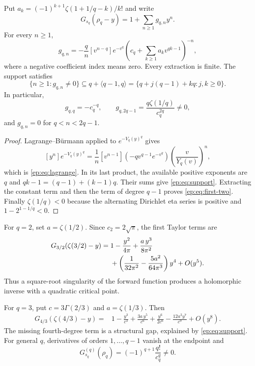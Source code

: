 \begin{proposition}
\label{ep:prop:coefficients}
Put $a_k=(-1)^{k+1}\zeta(1+1/q-k)/k!$ and write
\[
 G_{s_q}(\rho_q-y)=1+\sum_{n\ge1}g_{q,n}y^n.
\]
For every $n\ge1$,
\begin{equation}
 g_{q,n}=-\frac qn[v^{n-q}]
    e^{-v^q}\left(c_q+\sum_{k\ge1}a_kv^{qk-1}\right)^{-n},
 \label{ep:eq:lagrange}
\end{equation}
where a negative coefficient index means zero. Every extraction is
finite. The support satisfies
\begin{equation}
 \{n\ge1:g_{q,n}\ne0\}
 \subseteq q+\langle q-1,q\rangle
 =\{q+j(q-1)+kq:j,k\ge0\}.
 \label{ep:eq:support}
\end{equation}
In particular,
\begin{equation}
 g_{q,q}=-c_q^{-q},\qquad
 g_{q,2q-1}=\frac{q\zeta(1/q)}{c_q^{2q}}\ne0,
 \label{ep:eq:first-two}
\end{equation}
and $g_{q,n}=0$ for $q<n<2q-1$.
\end{proposition}

\begin{proof}
Lagrange--B\"urmann applied to $e^{-V_q(y)^q}$ gives
\[
 [y^n]e^{-V_q(y)^q}
 =\frac1n[v^{n-1}](-qv^{q-1}e^{-v^q})
                  \left(\frac v{Y_q(v)}\right)^n,
\]
which is \eqref{ep:eq:lagrange}. In its last product, the available
positive exponents are $q$ and $qk-1=(q-1)+(k-1)q$.
Their sums give \eqref{ep:eq:support}. Extracting the constant
term and then the term of degree $q-1$ proves
\eqref{ep:eq:first-two}. Finally $\zeta(1/q)<0$ because the
alternating Dirichlet eta series is positive and
$1-2^{1-1/q}<0$.
\end{proof}

For $q=2$, set $a=\zeta(1/2)$. Since $c_2=2\sqrt\pi$, the first
Taylor terms are
\begin{align}
 G_{3/2}(\zeta(3/2)-y)
 ={}&1-\frac{y^2}{4\pi}+\frac{a\,y^3}{8\pi^2}\notag\\
 &+\left(\frac1{32\pi^2}-\frac{5a^2}{64\pi^3}\right)y^4
 +O(y^5).
 \label{ep:eq:q2}
\end{align}
Thus a square-root singularity of the forward function produces a
holomorphic inverse with a quadratic critical point.

For $q=3$, put $c=3\Gamma(2/3)$ and $a=\zeta(1/3)$. Then
\begin{align}
 G_{4/3}(\zeta(4/3)-y)
 ={}&1-\frac{y^3}{c^3}+
       \frac{3a\,y^5}{c^6}+\frac{y^6}{2c^6}
       -\frac{12a^2y^7}{c^9}+O(y^8).
 \label{ep:eq:q3}
\end{align}
The missing fourth-degree term is a structural gap, explained by
\eqref{ep:eq:support}. For general $q$, derivatives of orders
$1,\ldots,q-1$ vanish at the endpoint and
\[
 G_{s_q}^{(q)}(\rho_q)=(-1)^{q+1}\frac{q!}{c_q^q}\ne0.
\]

